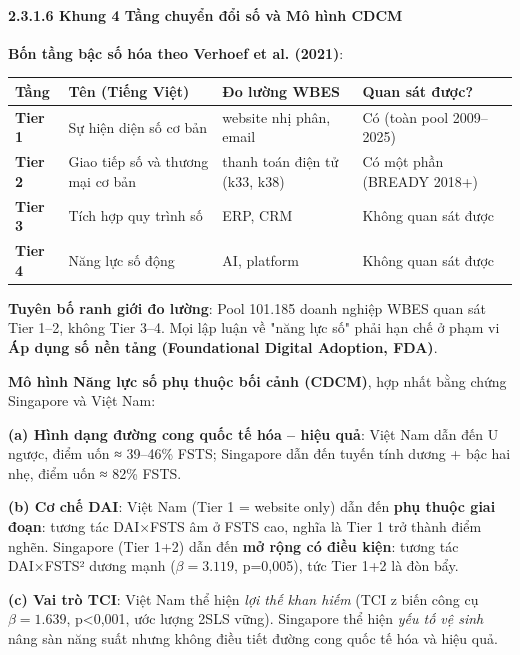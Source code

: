 \documentclass[12pt,a4paper]{article}
\begin{document}
\hypertarget{2316-khung-4-tux1ea7ng-chuyux1ec3n-ux111ux1ed5i-sux1ed1-vuxe0-muxf4-huxecnh-cdcm}{%
\paragraph{2.3.1.6 Khung 4 Tầng chuyển đổi số và Mô hình
CDCM}\label{2316-khung-4-tux1ea7ng-chuyux1ec3n-ux111ux1ed5i-sux1ed1-vuxe0-muxf4-huxecnh-cdcm}}

\textbf{Bốn tầng bậc số hóa theo Verhoef et al. (2021)}:

\begin{longtable}[]{@{}llll@{}}
\toprule\noalign{}
Tầng & Tên (Tiếng Việt) & Đo lường WBES & Quan sát được? \\
\midrule\noalign{}
\endhead
\bottomrule\noalign{}
\endlastfoot
\textbf{Tier 1} & Sự hiện diện số cơ bản & website nhị phân, email & Có
(toàn pool 2009--2025) \\
\textbf{Tier 2} & Giao tiếp số và thương mại cơ bản & thanh toán điện tử
(k33, k38) & Có một phần (BREADY 2018+) \\
\textbf{Tier 3} & Tích hợp quy trình số & ERP, CRM & Không quan sát
được \\
\textbf{Tier 4} & Năng lực số động & AI, platform & Không quan sát
được \\
\end{longtable}

\textbf{Tuyên bố ranh giới đo lường}: Pool 101.185 doanh nghiệp WBES
quan sát Tier 1--2, không Tier 3--4. Mọi lập luận về "năng lực số" phải
hạn chế ở phạm vi \textbf{Áp dụng số nền tảng (Foundational Digital
Adoption, FDA)}.

\textbf{Mô hình Năng lực số phụ thuộc bối cảnh (CDCM)}, hợp nhất bằng
chứng Singapore và Việt Nam:

\textbf{(a) Hình dạng đường cong quốc tế hóa -- hiệu quả}: Việt Nam dẫn
đến U ngược, điểm uốn ≈ 39--46\% FSTS; Singapore dẫn đến tuyến tính
dương + bậc hai nhẹ, điểm uốn ≈ 82\% FSTS.

\textbf{(b) Cơ chế DAI}: Việt Nam (Tier 1 = website only) dẫn đến
\textbf{phụ thuộc giai đoạn}: tương tác DAI×FSTS âm ở FSTS cao, nghĩa là
Tier 1 trở thành điểm nghẽn. Singapore (Tier 1+2) dẫn đến \textbf{mở
rộng có điều kiện}: tương tác DAI×FSTS² dương mạnh (\(\beta=3.119\),
p=0,005), tức Tier 1+2 là đòn bẩy.

\textbf{(c) Vai trò TCI}: Việt Nam thể hiện \emph{lợi thế khan hiếm}
(TCI z biến công cụ \(\beta=1.639\), p\textless0,001, ước lượng 2SLS
vững). Singapore thể hiện \emph{yếu tố vệ sinh} nâng sàn năng suất nhưng
không điều tiết đường cong quốc tế hóa và hiệu quả.
\end{document}
